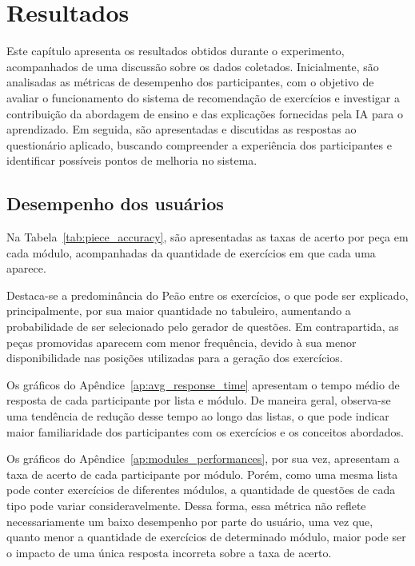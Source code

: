
\chapter{Resultados}
\label{cap:resultados}

Este capítulo apresenta os resultados obtidos durante o experimento, acompanhados de uma discussão sobre os dados coletados. Inicialmente, 
são analisadas as métricas de desempenho dos participantes, com o objetivo de avaliar o funcionamento do sistema de recomendação de 
exercícios e investigar  a contribuição da abordagem de ensino e das explicações fornecidas pela IA para o aprendizado. Em seguida, 
são apresentadas e discutidas as respostas ao questionário aplicado, buscando compreender a experiência dos participantes e identificar 
possíveis pontos de melhoria no sistema.

\section{Desempenho dos usuários}
\label{sec:users_performances}
Na Tabela~\ref{tab:piece_accuracy}, são apresentadas as taxas de acerto por peça em cada módulo, acompanhadas da quantidade de exercícios em que cada uma aparece.

Destaca-se a predominância do Peão entre os exercícios, o que pode ser explicado, principalmente, por sua maior quantidade no tabuleiro, aumentando a 
probabilidade de ser selecionado pelo gerador de questões. Em contrapartida, as peças promovidas aparecem com menor frequência, devido à sua menor disponibilidade 
nas posições utilizadas para a geração dos exercícios.

\begin{table}[H]
\centering
\caption{Taxa de acerto por peça}
\label{tab:piece_accuracy}
\small

\end{table}

Os gráficos do Apêndice~\ref{ap:avg_response_time} apresentam o tempo médio de resposta de cada participante por lista e módulo. De maneira geral, observa-se uma tendência de 
redução desse tempo ao longo das listas, o que pode indicar maior familiaridade dos participantes com os exercícios e os conceitos abordados. 

Os gráficos do Apêndice~\ref{ap:modules_performances}, por sua vez, apresentam a taxa de acerto de cada participante por módulo. Porém, como uma mesma lista pode conter 
exercícios de diferentes módulos, a quantidade de questões de cada tipo pode variar consideravelmente. Dessa forma, essa métrica não reflete necessariamente
um baixo desempenho por parte do usuário, uma vez que, quanto menor a quantidade de exercícios de determinado módulo, maior pode ser o impacto de uma única resposta incorreta 
sobre a taxa de acerto.

